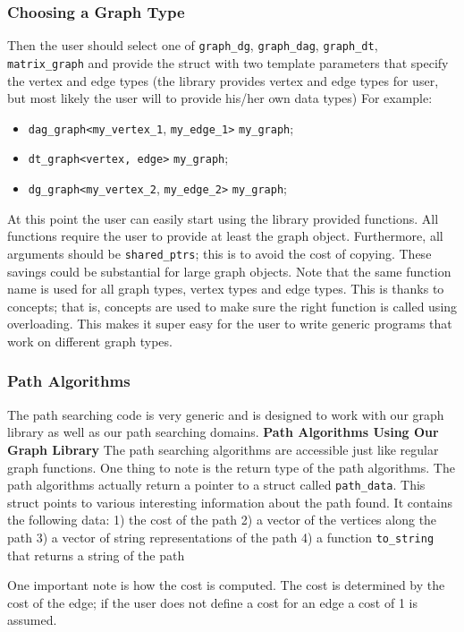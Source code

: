 \documentclass{article}
\begin{document}
\subsubsection{Choosing a Graph Type}
Then the user should select one of \texttt{graph\_dg}, \texttt{graph\_dag}, \texttt{graph\_dt}, \texttt{matrix\_graph} and provide the struct with two template parameters that specify the vertex and edge types (the library provides vertex and edge types for user, but most likely the user will to provide his/her own data types) 
For example: 
\begin{itemize}
\item \texttt{dag\_graph<}\texttt{my\_vertex\_1}, \texttt{my\_edge\_1>} \texttt{my\_graph}; 
\item \texttt{dt\_graph<vertex, edge>} \texttt{my\_graph}; 
\item \texttt{dg\_graph<}\texttt{my\_vertex\_2}, \texttt{my\_edge\_2>} \texttt{my\_graph};
\end{itemize}
 At this point the user can easily start using the library provided functions. All functions require the user to provide at least the graph object. Furthermore, all arguments should be \texttt{shared\_ptrs}; this is to avoid the cost of copying. These savings could be substantial for large graph objects.
Note that the same function name is used for all graph types, vertex types and edge types. This is thanks to concepts; that is, concepts are used to make sure the right function is called using overloading. This makes it super easy for the user to write generic programs that work on different graph types. 
\subsubsection{Path Algorithms}
The path searching code is very generic and is designed to work with our graph library as well as our path searching domains.  
\textbf{Path Algorithms Using Our Graph Library}
The path searching algorithms are accessible just like regular graph functions. One thing to note is the return type of the path algorithms. The path algorithms actually return a pointer to a struct called \texttt{path\_data}. This struct points to various interesting information about the path found. It contains the following data: 1) the cost of the path 2) a vector of the vertices along the path 3) a vector of string representations of the path 4) a function \texttt{to\_string} that returns a string of the path
\par
One important note is how the cost is computed. The cost is determined by the cost of the edge; if the user does not define a cost for an edge a cost of 1 is assumed.
\end{document}
